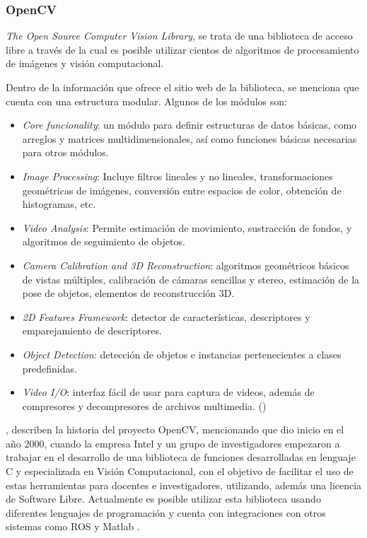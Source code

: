             
            \subsubsection{OpenCV}
            \textit{The Open Source Computer Vision Library}, se trata de una biblioteca de acceso libre a través de la cual es posible utilizar cientos de algoritmos de procesamiento de imágenes y visión computacional.
            
            Dentro de la información que ofrece el sitio web de la biblioteca, se menciona que cuenta con una estructura modular. Algunos de los módulos son:
            \begin{itemize}
                \item \textit{Core funcionality}: un módulo para definir estructuras de datos básicas, como arreglos y matrices multidimensionales, así como funciones básicas necesarias para otros módulos.
                \item \textit{Image Processing}: Incluye filtros lineales y no lineales, transformaciones geométricas de imágenes, conversión entre espacios de color, obtención de histogramas, etc.
                \item \textit{Video Analysis}: Permite estimación de movimiento, sustracción de fondos, y algoritmos de seguimiento de objetos. 
                \item \textit{Camera Calibration and 3D Reconstruction}: algoritmos geométricos básicos de vistas múltiples, calibración de cámaras sencillas y stereo, estimación de la pose de objetos, elementos de reconstrucción 3D.
                \item \textit{2D Features Framework}: detector de características, descriptores y emparejamiento de descriptores. 
                \item \textit{Object Detection}: detección de objetos e instancias pertenecientes a clases predefinidas.
                \item \textit{Video I/O}: interfaz fácil de usar para captura de videos, además de compresores y decompresores de archivos multimedia. (\cite*{OpvenCV-website})
            \end{itemize}

            \cite{arevalo_librerivision_nodate}, describen la historia del proyecto OpenCV, mencionando que dio inicio en el año 2000, cuando la empresa Intel y un grupo de investigadores empezaron a trabajar en el desarrollo de una biblioteca de funciones desarrolladas en lenguaje C y especializada en Visión Computacional, con el objetivo de facilitar el uso de estas herramientas para docentes e investigadores, utilizando, además una licencia de Software Libre. 
            Actualmente es posible utilizar esta biblioteca usando diferentes lenguajes de programación y cuenta con integraciones con otros sistemas como ROS y Matlab \textregistered.

